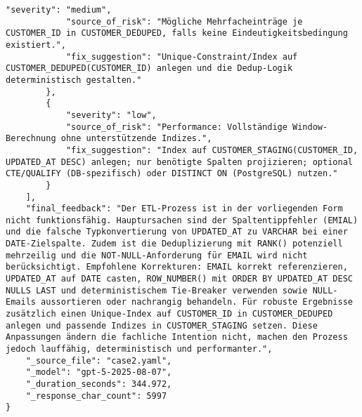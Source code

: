 \begin{lstlisting}[caption={Ausgabe: GPT-5 Anwendungsfall 2 Robustheitsdurchlauf},label={gpt_case2_prompt3}]
            "severity": "medium",
            "source_of_risk": "Mögliche Mehrfacheinträge je CUSTOMER_ID in CUSTOMER_DEDUPED, falls keine Eindeutigkeitsbedingung existiert.",
            "fix_suggestion": "Unique-Constraint/Index auf CUSTOMER_DEDUPED(CUSTOMER_ID) anlegen und die Dedup-Logik deterministisch gestalten."
        },
        {
            "severity": "low",
            "source_of_risk": "Performance: Vollständige Window-Berechnung ohne unterstützende Indizes.",
            "fix_suggestion": "Index auf CUSTOMER_STAGING(CUSTOMER_ID, UPDATED_AT DESC) anlegen; nur benötigte Spalten projizieren; optional CTE/QUALIFY (DB-spezifisch) oder DISTINCT ON (PostgreSQL) nutzen."
        }
    ],
    "final_feedback": "Der ETL-Prozess ist in der vorliegenden Form nicht funktionsfähig. Hauptursachen sind der Spaltentippfehler (EMIAL) und die falsche Typkonvertierung von UPDATED_AT zu VARCHAR bei einer DATE-Zielspalte. Zudem ist die Deduplizierung mit RANK() potenziell mehrzeilig und die NOT-NULL-Anforderung für EMAIL wird nicht berücksichtigt. Empfohlene Korrekturen: EMAIL korrekt referenzieren, UPDATED_AT auf DATE casten, ROW_NUMBER() mit ORDER BY UPDATED_AT DESC NULLS LAST und deterministischem Tie-Breaker verwenden sowie NULL-Emails aussortieren oder nachrangig behandeln. Für robuste Ergebnisse zusätzlich einen Unique-Index auf CUSTOMER_ID in CUSTOMER_DEDUPED anlegen und passende Indizes in CUSTOMER_STAGING setzen. Diese Anpassungen ändern die fachliche Intention nicht, machen den Prozess jedoch lauffähig, deterministisch und performanter.",
    "_source_file": "case2.yaml",
    "_model": "gpt-5-2025-08-07",
    "_duration_seconds": 344.972,
    "_response_char_count": 5997
}
\end{lstlisting}

